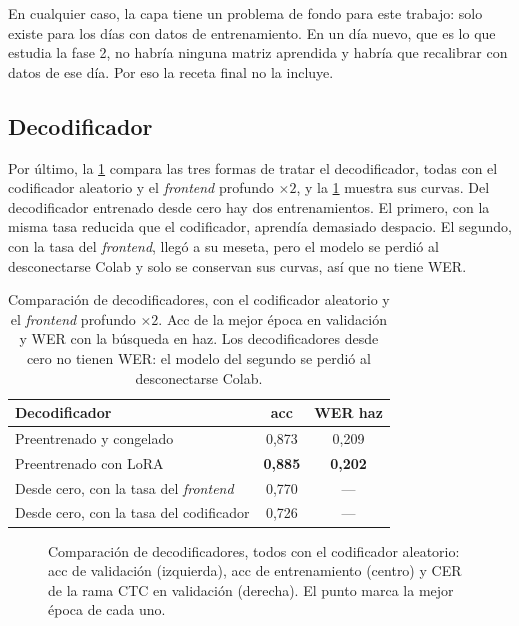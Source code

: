 En cualquier caso, la capa tiene un problema de fondo para este trabajo: solo existe para los días con datos de entrenamiento. En un día nuevo, que es lo que estudia la fase 2, no habría ninguna matriz aprendida y habría que recalibrar con datos de ese día. Por eso la receta final no la incluye.

\subsection{Decodificador}
\label{sec:res-decodificador}

Por último, la \cref{tab:res-decodificador} compara las tres formas de tratar el decodificador, todas con el codificador aleatorio y el \textit{frontend} profundo $\times 2$, y la \cref{fig:res-decodificadores} muestra sus curvas. Del decodificador entrenado desde cero hay dos entrenamientos. El primero, con la misma tasa reducida que el codificador, aprendía demasiado despacio. El segundo, con la tasa del \textit{frontend}, llegó a su meseta, pero el modelo se perdió al desconectarse Colab y solo se conservan sus curvas, así que no tiene WER.

\begin{table}[htbp]
  \centering
  \caption{Comparación de decodificadores, con el codificador aleatorio y el \textit{frontend} profundo $\times 2$. Acc de la mejor época en validación y WER con la búsqueda en haz. Los decodificadores desde cero no tienen WER: el modelo del segundo se perdió al desconectarse Colab.}
  \label{tab:res-decodificador}
  \small
  \begin{tabular}{lcc}
    \toprule
    \textbf{Decodificador} & \textbf{acc} & \textbf{WER haz} \\
    \midrule
    Preentrenado y congelado                     & 0,873          & 0,209 \\
    Preentrenado con LoRA                        & \textbf{0,885} & \textbf{0,202} \\
    Desde cero, con la tasa del \textit{frontend} & 0,770          & --- \\
    Desde cero, con la tasa del codificador      & 0,726          & --- \\
    \bottomrule
  \end{tabular}
\end{table}

\begin{figure}[htbp]
  \centering
  \caption{Comparación de decodificadores, todos con el codificador aleatorio: acc de validación (izquierda), acc de entrenamiento (centro) y CER de la rama CTC en validación (derecha). El punto marca la mejor época de cada uno.}
  \label{fig:res-decodificadores}
\end{figure}

